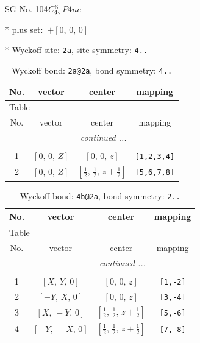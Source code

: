 \documentclass[fleqn,8pt]{jsarticle}
\begin{document}
\setcounter{MaxMatrixCols}{32}

\renewcommand{\tablename}{Table~}
\renewcommand{\figurename}{Figure~}
\begin{center}
\LARGE
SG No. 104\quad$C_{\rm 4v}^{6}$\quad$P4nc$\quad[ tetragonal ]
\end{center}

* plus set:\,\,\,$+\left[ 0,\, 0,\, 0 \right]$


* Wyckoff site: {\tt 2a}, site symmetry: {\tt 4..}
\renewcommand{\arraystretch}{1.2}
\begin{longtable}{cccc}
\caption{Wyckoff bond: {\tt 2a@2a}, bond symmetry: {\tt 4..}}
 \\
 \hline \hline
No. & vector & center & mapping \\ \hline \endfirsthead

\multicolumn{3}{l}{\tablename\ \thetable{}} \\
 \hline \hline
No. & vector & center & mapping \\ \hline \endhead

 \hline \hline
\multicolumn{3}{r}{\footnotesize\it continued ...} \\ \endfoot

 \hline \hline
\multicolumn{3}{r}{} \\ \endlastfoot

1 & $\left[ 0,\, 0,\, Z \right]$ & $\left[ 0,\, 0,\, z \right]$ & {\tt [1,2,3,4]} \\ \hline
2 & $\left[ 0,\, 0,\, Z \right]$ & $\left[ \frac{1}{2},\, \frac{1}{2},\, z + \frac{1}{2} \right]$ & {\tt [5,6,7,8]} \\
\end{longtable}
\renewcommand{\arraystretch}{1.2}
\begin{longtable}{cccc}
\caption{Wyckoff bond: {\tt 4b@2a}, bond symmetry: {\tt 2..}}
 \\
 \hline \hline
No. & vector & center & mapping \\ \hline \endfirsthead

\multicolumn{3}{l}{\tablename\ \thetable{}} \\
 \hline \hline
No. & vector & center & mapping \\ \hline \endhead

 \hline \hline
\multicolumn{3}{r}{\footnotesize\it continued ...} \\ \endfoot

 \hline \hline
\multicolumn{3}{r}{} \\ \endlastfoot

1 & $\left[ X,\, Y,\, 0 \right]$ & $\left[ 0,\, 0,\, z \right]$ & {\tt [1,-2]} \\ \hline
2 & $\left[ - Y,\, X,\, 0 \right]$ & $\left[ 0,\, 0,\, z \right]$ & {\tt [3,-4]} \\ \hline
3 & $\left[ X,\, - Y,\, 0 \right]$ & $\left[ \frac{1}{2},\, \frac{1}{2},\, z + \frac{1}{2} \right]$ & {\tt [5,-6]} \\ \hline
4 & $\left[ - Y,\, - X,\, 0 \right]$ & $\left[ \frac{1}{2},\, \frac{1}{2},\, z + \frac{1}{2} \right]$ & {\tt [7,-8]} \\
\end{longtable}
\end{document}
